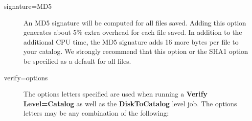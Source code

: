 \begin{description}
\item [signature=MD5]
   An MD5 signature will be computed for all  files saved. Adding this option
   generates about 5\% extra overhead  for each file saved. In addition to the
   additional CPU time,  the MD5 signature adds 16 more bytes per file to your
   catalog.  We strongly recommend that this option or the SHA1 option  be
   specified as a default for all files. 

\item [verify=\lt{}options\gt{}]
   The options letters specified are used  when running a {\bf Verify
   Level=Catalog} as well as the  {\bf DiskToCatalog} level job. The options
   letters may be any  combination of the following:  



\end{description}
